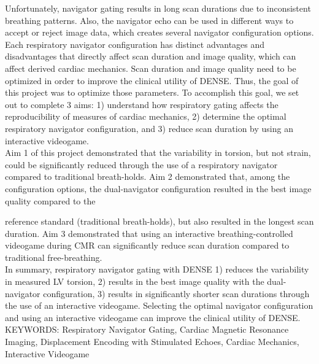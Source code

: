 Unfortunately, navigator gating results in long scan durations due to inconsistent breathing patterns. Also, the navigator echo can be used in different ways to accept or reject image data, which creates several navigator configuration options. Each respiratory navigator configuration has distinct advantages and disadvantages that directly affect scan duration and image quality, which can affect derived cardiac mechanics. Scan duration and image quality need to be optimized in order to improve the clinical utility of DENSE. Thus, the goal of this project was to optimize those parameters. To accomplish this goal, we set out to complete 3 aims: 1) understand how respiratory gating affects the reproducibility of measures of cardiac mechanics, 2) determine the optimal respiratory navigator configuration, and 3) reduce scan duration by using an interactive videogame.\\

Aim 1 of this project demonstrated that the variability in torsion, but not strain, could be significantly reduced through the use of a respiratory navigator compared to traditional breath-holds. Aim 2 demonstrated that, among the configuration options, the dual-navigator configuration resulted in the best image quality compared to the

\restoregeometry
\thispagestyle{empty} %

\noindent reference standard (traditional breath-holds), but also resulted in the longest scan duration. Aim 3 demonstrated that using an interactive breathing-controlled videogame during CMR can significantly reduce scan duration compared to traditional free-breathing. \\

In summary, respiratory navigator gating with DENSE 1) reduces the variability in measured LV torsion, 2) results in the best image quality with the dual-navigator configuration, 3) results in significantly shorter scan durations through the use of an interactive videogame. Selecting the optimal navigator configuration and using an interactive videogame can improve the clinical utility of DENSE.\\

\noindent KEYWORDS: Respiratory Navigator Gating, Cardiac Magnetic Resonance Imaging, Displacement Encoding with Stimulated Echoes, Cardiac Mechanics, Interactive Videogame

\vspace{5.03125in}        %
					



